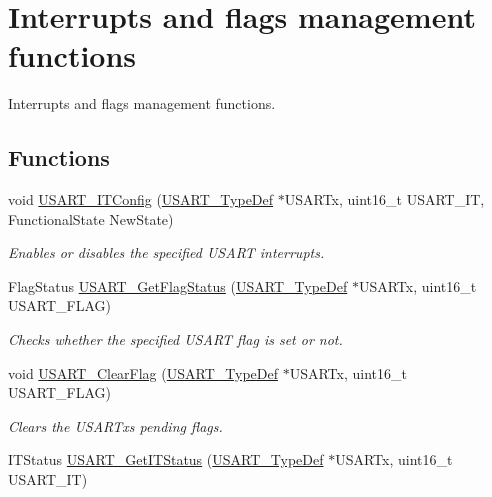 \hypertarget{group___u_s_a_r_t___group9}{}\section{Interrupts and flags management functions}
\label{group___u_s_a_r_t___group9}


Interrupts and flags management functions.  


\subsection*{Functions}
\begin{DoxyCompactItemize}
\item 
void \hyperlink{group___u_s_a_r_t___group9_ga6d8f2dd1f34060ae7e386e3e5d56b6f6}{U\+S\+A\+R\+T\+\_\+\+I\+T\+Config} (\hyperlink{struct_u_s_a_r_t___type_def}{U\+S\+A\+R\+T\+\_\+\+Type\+Def} $\ast$U\+S\+A\+R\+Tx, uint16\+\_\+t U\+S\+A\+R\+T\+\_\+\+IT, Functional\+State New\+State)
\begin{DoxyCompactList}\small\item\em Enables or disables the specified U\+S\+A\+RT interrupts. \end{DoxyCompactList}\item 
Flag\+Status \hyperlink{group___u_s_a_r_t___group9_ga144630722defc9e312f0ad280b68e9da}{U\+S\+A\+R\+T\+\_\+\+Get\+Flag\+Status} (\hyperlink{struct_u_s_a_r_t___type_def}{U\+S\+A\+R\+T\+\_\+\+Type\+Def} $\ast$U\+S\+A\+R\+Tx, uint16\+\_\+t U\+S\+A\+R\+T\+\_\+\+F\+L\+AG)
\begin{DoxyCompactList}\small\item\em Checks whether the specified U\+S\+A\+RT flag is set or not. \end{DoxyCompactList}\item 
void \hyperlink{group___u_s_a_r_t___group9_gad962e148fc466ae1b45b288f6c91d966}{U\+S\+A\+R\+T\+\_\+\+Clear\+Flag} (\hyperlink{struct_u_s_a_r_t___type_def}{U\+S\+A\+R\+T\+\_\+\+Type\+Def} $\ast$U\+S\+A\+R\+Tx, uint16\+\_\+t U\+S\+A\+R\+T\+\_\+\+F\+L\+AG)
\begin{DoxyCompactList}\small\item\em Clears the U\+S\+A\+R\+Tx\textquotesingle{}s pending flags. \end{DoxyCompactList}\item 
I\+T\+Status \hyperlink{group___u_s_a_r_t___group9_ga93d8f031241bcdbe938d091a85295445}{U\+S\+A\+R\+T\+\_\+\+Get\+I\+T\+Status} (\hyperlink{struct_u_s_a_r_t___type_def}{U\+S\+A\+R\+T\+\_\+\+Type\+Def} $\ast$U\+S\+A\+R\+Tx, uint16\+\_\+t U\+S\+A\+R\+T\+\_\+\+IT)

\end{DoxyCompactItemize}
